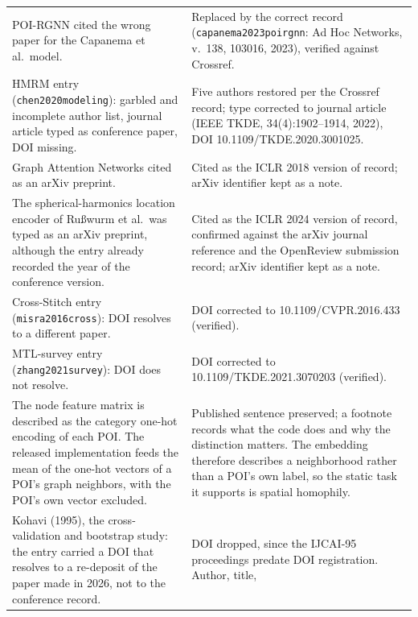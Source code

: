 {\begin{longtable}{@{}p{}p{}@{}}
POI-RGNN cited the wrong paper for the Capanema et al.\ model. &
Replaced by the correct record (\texttt{capanema2023poirgnn}: Ad Hoc Networks,
v.~138, 103016, 2023), verified against Crossref. \\
\addlinespace
HMRM entry (\texttt{chen2020modeling}): garbled and incomplete author list, journal
article typed as conference paper, DOI missing. &
Five authors restored per the Crossref record; type corrected to journal article
(IEEE TKDE, 34(4):1902--1914, 2022), DOI 10.1109/TKDE.2020.3001025. \\
\addlinespace
Graph Attention Networks cited as an arXiv preprint. &
Cited as the ICLR 2018 version of record; arXiv identifier kept as a note. \\
\addlinespace
The spherical-harmonics location encoder of Ru\ss{}wurm et al.\ was typed as an arXiv
preprint, although the entry already recorded the year of the conference version. &
Cited as the ICLR 2024 version of record, confirmed against the arXiv journal reference
and the OpenReview submission record; arXiv identifier kept as a note. \\
\addlinespace
Cross-Stitch entry (\texttt{misra2016cross}): DOI resolves to a different paper. &
DOI corrected to 10.1109/CVPR.2016.433 (verified). \\
\addlinespace
MTL-survey entry (\texttt{zhang2021survey}): DOI does not resolve. &
DOI corrected to 10.1109/TKDE.2021.3070203 (verified). \\
\addlinespace
The node feature matrix is described as the category one-hot encoding of each POI. The
released implementation feeds the mean of the one-hot vectors of a POI's graph
neighbors, with the POI's own vector excluded. &
Published sentence preserved; a footnote records what the code does and why the
distinction matters. The embedding therefore describes a neighborhood rather than a
POI's own label, so the static task it supports is spatial homophily. \\
Kohavi (1995), the cross-validation and bootstrap study: the entry carried a DOI that
resolves to a re-deposit of the paper made in 2026, not to the conference record. &
DOI dropped, since the IJCAI-95 proceedings predate DOI registration. Author, title,

\end{longtable}}
